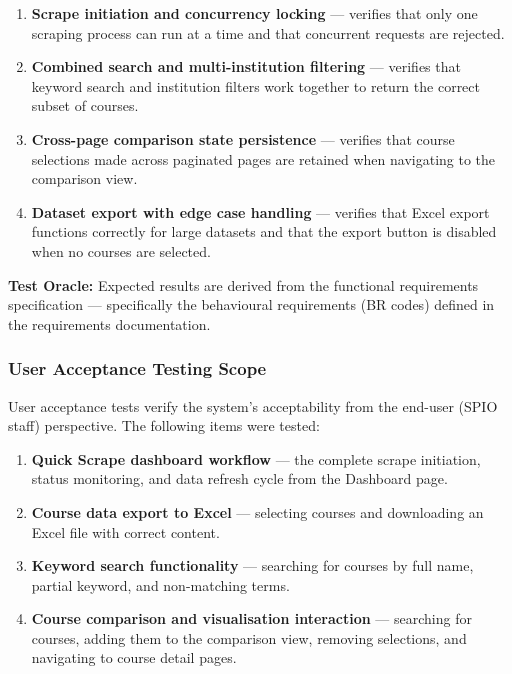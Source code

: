 \begin{enumerate}
    \item \textbf{Scrape initiation and concurrency locking} --- verifies that only one scraping process can run at a time and that concurrent requests are rejected.
    \item \textbf{Combined search and multi-institution filtering} --- verifies that keyword search and institution filters work together to return the correct subset of courses.
    \item \textbf{Cross-page comparison state persistence} --- verifies that course selections made across paginated pages are retained when navigating to the comparison view.
    \item \textbf{Dataset export with edge case handling} --- verifies that Excel export functions correctly for large datasets and that the export button is disabled when no courses are selected.
\end{enumerate}

\noindent\textbf{Test Oracle:} Expected results are derived from the functional requirements specification --- specifically the behavioural requirements (BR codes) defined in the requirements documentation.

\subsubsection*{User Acceptance Testing Scope}

User acceptance tests verify the system's acceptability from the end-user (SPIO staff) perspective. The following items were tested:

\begin{enumerate}
    \item \textbf{Quick Scrape dashboard workflow} --- the complete scrape initiation, status monitoring, and data refresh cycle from the Dashboard page.
    \item \textbf{Course data export to Excel} --- selecting courses and downloading an Excel file with correct content.
    \item \textbf{Keyword search functionality} --- searching for courses by full name, partial keyword, and non-matching terms.
    \item \textbf{Course comparison and visualisation interaction} --- searching for courses, adding them to the comparison view, removing selections, and navigating to course detail pages.
\end{enumerate}


